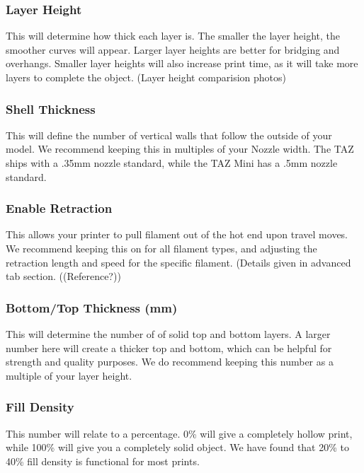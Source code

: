 \subsubsection{Layer Height}

This will determine how thick each layer is. The smaller the layer height, the smoother curves will appear. Larger layer heights are better for bridging and overhangs. Smaller layer heights will also increase print time, as it will take more layers to complete the object. (Layer height comparision photos)

\subsubsection{Shell Thickness}

This will define the number of vertical walls that follow the outside of your model. We recommend keeping this in multiples of your Nozzle width. The TAZ ships with a .35mm nozzle standard, while the TAZ Mini has a .5mm nozzle standard.

\subsubsection{Enable Retraction}

This allows your printer to pull filament out of the hot end upon travel moves. We recommend keeping this on for all filament types, and adjusting the retraction length and speed for the specific filament. (Details given in advanced tab section. ((Reference?))

\subsubsection{Bottom/Top Thickness (mm)}

This will determine the number of of solid top and bottom layers. A larger number here will create a thicker top and bottom, which can be helpful for strength and quality purposes. We do recommend keeping this number as a multiple of your layer height.

\subsubsection{Fill Density}

This number will relate to a percentage. 0\% will give a completely hollow print, while 100\% will give you a completely solid object. We have found that 20\% to 40\% fill density is functional for most prints.

